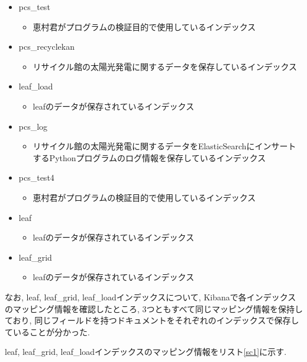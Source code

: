 \documentclass[a4j,12pt,]{jarticle}
\begin{document}
\begin{itemize}
  \item pcs\_test
  \begin{itemize}
    \item 恵村君がプログラムの検証目的で使用しているインデックス
  \end{itemize}
  \item pcs\_recyclekan
  \begin{itemize}
    \item リサイクル館の太陽光発電に関するデータを保存しているインデックス
  \end{itemize}
  \item leaf\_load
  \begin{itemize}
    \item leafのデータが保存されているインデックス
  \end{itemize}
  \item pcs\_log
  \begin{itemize}
    \item リサイクル館の太陽光発電に関するデータをElasticSearchにインサートするPythonプログラムのログ情報を保存しているインデックス
  \end{itemize}
  \item pcs\_test4
  \begin{itemize}
    \item 恵村君がプログラムの検証目的で使用しているインデックス
  \end{itemize}
  \item leaf
  \begin{itemize}
    \item leafのデータが保存されているインデックス
  \end{itemize}
  \item leaf\_grid
  \begin{itemize}
    \item leafのデータが保存されているインデックス
  \end{itemize}
\end{itemize}

なお, leaf, leaf\_grid, leaf\_loadインデックスについて, Kibanaで各インデックスのマッピング情報を確認したところ, 3つともすべて同じマッピング情報を保持しており, 同じフィールドを持つドキュメントをそれぞれのインデックスで保存していることが分かった.

leaf, leaf\_grid, leaf\_loadインデックスのマッピング情報をリスト\ref{sc1}に示す.
\end{document}
